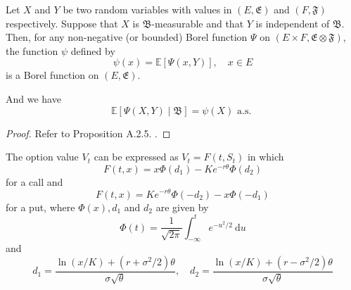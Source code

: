 \begin{lemma}
    Let $X$ and $Y$ be two random variables with values in $(E, \mathfrak{E})$ and $(F, \mathfrak{F})$ respectively. Suppose that $X$ is $\mathfrak{B}$-measurable and that $Y$ is independent of $\mathfrak{B}$. Then, for any non-negative (or bounded) Borel function $\Psi$ on $(E \times F, \mathfrak{E} \otimes \mathfrak{F})$, the function $\psi$ defined by 
    \[
        \psi(x) = \mathbb{E}[\Psi(x, Y)], \quad x \in E
    \]
    is a Borel function on $(E, \mathfrak{E})$. 

    And we have 
    \[
        \mathbb{E}[\Psi(X, Y) \mid \mathfrak{B}] = \psi(X) \text{ a.s. }
    \]
\end{lemma}

\begin{proof}
    Refer to Proposition A.2.5. \cite[p. 240]{lamberton2011introduction}.
\end{proof}

\begin{proposition}\label{prop:202305191628}
    The option value $V_t$ can be expressed as $V_t = F(t, S_t)$ in which 
    \[
        F(t, x) = x\Phi(d_1) - Ke^{-r\theta} \Phi(d_2)
    \]
    for a call and 
    \[
        F(t, x) = Ke^{-r\theta} \Phi(-d_2) - x\Phi(-d_1)
    \]
    for a put, where $\Phi(x), d_1$ and $d_2$ are given by 
    \[
        \Phi(t) = \frac{1}{\sqrt{2\pi}} \int_{- \infty}^t e^{-u^2 / 2}~\mathrm{d}u
    \]
    and 
    \[
        d_1 = \frac{\ln(x/K) + (r + \sigma^2 / 2)\theta}{\sigma \sqrt{\theta}},
        \quad
        d_2 = \frac{\ln(x/K) + (r - \sigma^2 / 2)\theta}{\sigma \sqrt{\theta}}
    \]
\end{proposition}

